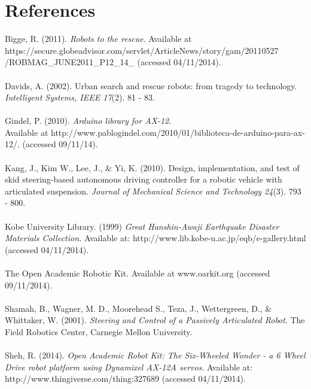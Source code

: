 \documentclass[]{article}
\begin{document}
\section{References}
Bigge, R. (2011). \textit{Robots to the rescue}. Available at\\
https://secure.globeadvisor.com/servlet/ArticleNews/story/gam/20110527\\
/ROBMAG\_JUNE2011\_P12\_14\_ (accessed 04/11/2014).\\
\\
Davids, A. (2002). Urban search and rescue robots: from tragedy to technology. \textit{Intelligent Systems, IEEE 17}(2). 81 - 83.\\
\\
Gindel, P. (2010). \textit{Arduino library for AX-12}. \\Available at http://www.pablogindel.com/2010/01/biblioteca-de-arduino-para-ax-12/. (accessed 09/11/14).\\
\\
Kang, J., Kim W., Lee, J., \& Yi, K. (2010). Design, implementation, and test of skid steering-based autonomous driving controller for a robotic vehicle with articulated suspension. \textit{Journal of Mechanical Science and Technology 24}(3). 793 - 800.\\
\\
Kobe University Library. (1999) \textit{Great Hanshin-Awaji Earthquake Disaster Materials Collection.} Available at: http://www.lib.kobe-u.ac.jp/eqb/e-gallery.html (accessed 04/11/2014).\\
\\
The Open Academic Robotic Kit. Available at www.oarkit.org (accessed 09/11/2014).\\
\\
Shamah, B.,  Wagner, M. D., Moorehead S., Teza, J., Wettergreen, D., \& Whittaker, W. (2001). \textit{Steering and Control of a Passively Articulated Robot}. The Field Robotics Center, Carnegie Mellon University.\\
\\
Sheh, R. (2014). \textit{Open Academic Robot Kit: The Six-Wheeled Wonder - a 6 Wheel Drive robot platform using Dynamixel AX-12A servos}. Available at: http://www.thingiverse.com/thing:327689 (accessed 04/11/2014).
\end{document}
